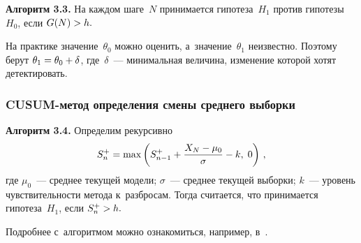 \begin{multicols}{2}
\smallskip

\noindent
\textbf{Алгоритм 3.3.} %
На каждом шаге~$N$ принимается гипотеза~$H_1$ против гипотезы~$H_0$, если 
$G(N)\hm>h.$


\smallskip

На практике значение~$\theta_0$ можно оценить, а~значение~$\theta_1$ неизвестно. 
Поэтому  берут $\theta_1 \hm= \theta_0 \hm+ \delta$, где~$\delta$~--- минимальная 
величина, изменение которой хотят детектировать.

\subsubsection*{CUSUM-метод определения смены среднего выборки}


\noindent
\textbf{Алгоритм 3.4.} %
Определим рекурсивно 
\begin{equation*} 
S_n^+=\max\left (S_{n- 1}^+ + 
\displaystyle\frac{\displaystyle X_N - \mu_0\mathstrut}{\displaystyle \sigma\mathstrut} - k, \;0\right)\,, 
\end{equation*}
где $\mu_0$~--- среднее текущей модели; $\sigma$~--- среднее текущей выборки; $k$~--- 
уровень чувствительности метода к~разбросам. Тогда считается, что принимается 
гипотеза~$H_1$, если $S^+_n \hm> h.$

\smallskip

Подробнее с~алгоритмом можно 
ознакомиться, например, в~\cite{page61}.

\begin{figure*}[b] %
 \vspace*{1pt}
 \begin{minipage}[t]{79mm}
\begin{center}
\mbox{%
\epsfxsize=77.835mm
}
\end{center}
\vspace*{-9pt}
  \label{pacfpic}
  \end{minipage}
\hfill
        \vspace*{1pt}
         \begin{minipage}[t]{79mm}
\begin{center}
\mbox{%
\epsfxsize=78.035mm
}
\end{center}
\vspace*{-9pt}
  \label{acfpic}
    \end{minipage}
\end{figure*}


\end{multicols}
